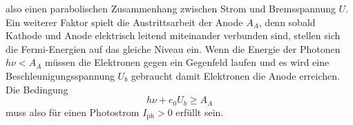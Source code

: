 also einen parabolischen Zusammenhang zwischen Strom und Bremsspannung $U$. 
\\
Ein weiterer Faktor spielt die Austrittsarbeit der Anode $A_{A}$, denn sobald Kathode und Anode elektrisch leitend miteinander verbunden sind, stellen sich die Fermi-Energien auf das gleiche Niveau ein. Wenn die Energie der Photonen $h\nu < A_{A}$ müssen die Elektronen
gegen ein Gegenfeld laufen und es wird eine Beschleunigungsspannung $U_{b}$ gebraucht damit Elektronen die Anode erreichen.
Die Bedingung 
\begin{equation*}
h\nu + e_{0} U_{b} \geq A_{A}
\end{equation*}
muss also für einen Photostrom $I_{\text{ph}} > 0$ erfüllt sein. 